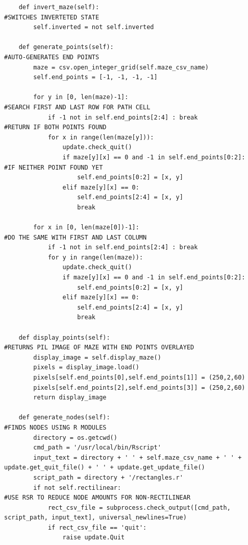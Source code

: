 \documentclass[titlepage]{article}
\begin{document}
\begin{changemargin}{-1in}{-1in}
\begin{verbatim}
    def invert_maze(self):                                                      #SWITCHES INVERTETED STATE
        self.inverted = not self.inverted
        
    def generate_points(self):                                                  #AUTO-GENERATES END POINTS 
        maze = csv.open_integer_grid(self.maze_csv_name)
        self.end_points = [-1, -1, -1, -1]

        for y in [0, len(maze)-1]:                                              #SEARCH FIRST AND LAST ROW FOR PATH CELL
            if -1 not in self.end_points[2:4] : break                           #RETURN IF BOTH POINTS FOUND
            for x in range(len(maze[y])):
                update.check_quit()
                if maze[y][x] == 0 and -1 in self.end_points[0:2]:              #IF NEITHER POINT FOUND YET
                    self.end_points[0:2] = [x, y]
                elif maze[y][x] == 0:
                    self.end_points[2:4] = [x, y]
                    break

        for x in [0, len(maze[0])-1]:                                           #DO THE SAME WITH FIRST AND LAST COLUMN
            if -1 not in self.end_points[2:4] : break 
            for y in range(len(maze)):
                update.check_quit()
                if maze[y][x] == 0 and -1 in self.end_points[0:2]:
                    self.end_points[0:2] = [x, y]
                elif maze[y][x] == 0:
                    self.end_points[2:4] = [x, y]
                    break

    def display_points(self):                                                   #RETURNS PIL IMAGE OF MAZE WITH END POINTS OVERLAYED
        display_image = self.display_maze()
        pixels = display_image.load()
        pixels[self.end_points[0],self.end_points[1]] = (250,2,60)
        pixels[self.end_points[2],self.end_points[3]] = (250,2,60)
        return display_image

    def generate_nodes(self):                                                   #FINDS NODES USING R MODULES
        directory = os.getcwd()
        cmd_path = '/usr/local/bin/Rscript'
        input_text = directory + ' ' + self.maze_csv_name + ' ' + update.get_quit_file() + ' ' + update.get_update_file()
        script_path = directory + '/rectangles.r'
        if not self.rectilinear:                                                #USE RSR TO REDUCE NODE AMOUNTS FOR NON-RECTILINEAR 
            rect_csv_file = subprocess.check_output([cmd_path, script_path, input_text], universal_newlines=True)
            if rect_csv_file == 'quit':
                raise update.Quit


\end{verbatim}
\end{changemargin}
\end{document}

